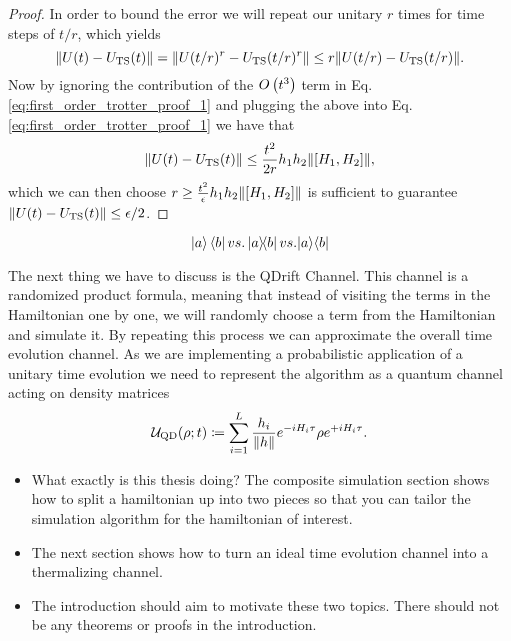 \begin{proof}
    In order to bound the error we will repeat our unitary $r$ times for time steps of $t/r$, which yields
    \begin{equation}
        \norm{U(t) - U_{\rm TS}(t)} = \norm{U(t/r)^r - U_{\rm TS}(t/r)^r} \le r \norm{U(t/r) - U_{\rm TS}(t/r)}.
    \end{equation}
    Now by ignoring the contribution of the $O\left( t^3 \right)$ term in Eq. \ref{eq:first_order_trotter_proof_1} and plugging the above into Eq. \ref{eq:first_order_trotter_proof_1} we have that 
    \begin{equation}
        \norm{U(t) - U_{\rm TS}(t)} \le \frac{t^2}{2 r} h_1 h_2 \norm{[H_1, H_2]},
    \end{equation}
    which we can then choose $r \ge \frac{t^2}{\epsilon}h_1 h_2 \norm{[H_1, H_2]}$ is sufficient to guarantee $\norm{U(t) - U_{\rm TS}(t)} \le \epsilon / 2$.
\end{proof}

$$\ket{a}\bra{b} vs. \ketbra{a}{b} vs. |a\rangle\langle b|$$

The next thing we have to discuss is the QDrift Channel. This channel is a randomized product formula, meaning that instead of visiting the terms in the Hamiltonian one by one, we will randomly choose a term from the Hamiltonian and simulate it. By repeating this process we can approximate the overall time evolution channel. As we are implementing a probabilistic application of a unitary time evolution we need to represent the algorithm as a quantum channel acting on density matrices
\begin{equation}
    \mathcal{U}_{\rm QD}(\rho; t) \coloneqq \sum_{i = 1}^L \frac{h_i}{\norm{h}} e^{-i H_i \tau} \rho e^{+i H_i \tau}.
\end{equation}

\begin{itemize}
    \item What exactly is this thesis doing? The composite simulation section shows how to split a hamiltonian up into two pieces so that you can tailor the simulation algorithm for the hamiltonian of interest. 
    \item The next section shows how to turn an ideal time evolution channel into a thermalizing channel. 
    \item The introduction should aim to motivate these two topics. There should not be any theorems or proofs in the introduction.
\end{itemize}

